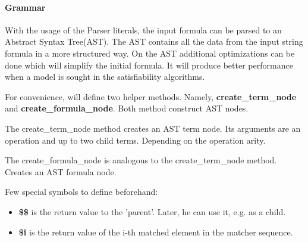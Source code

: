 \documentclass{article}
\begin{document}
		\paragraph{Grammar}
			With the usage of the Parser literals, the input formula can be parsed to an Abstract Syntax Tree(AST).
			The AST contains all the data from the input string formula in a more structured way.
			On the AST additional optimizations can be done which will simplify the initial formula. It will produce better performance when a model is sought in the satisfiability algorithms.

			For convenience, will define two helper methods. Namely, \textbf{create\_term\_node} and \textbf{create\_formula\_node}. Both method construct AST nodes.

			The create\_term\_node method creates an AST term node. Its arguments are an operation and up to two child terms. Depending on the operation arity.

			The create\_formula\_node is analogous to the create\_term\_node method. Creates an AST formula node.

			Few special symbols to define beforehand:
			\begin{itemize}
				\item \textbf{\$\$} is the return value to the 'parent'. Later, he can use it, e.g. as a child.
				\item \textbf{\$i} is the return value of the i-th matched element in the matcher sequence.
			\end{itemize}
\end{document}
